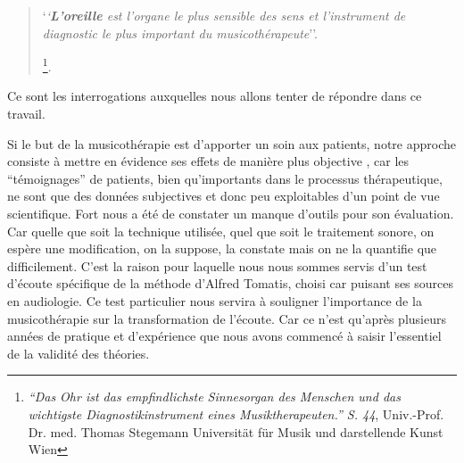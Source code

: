 \begin{quotation}
	`\textit{`\textbf{L'oreille }est l'organe le plus sensible des sens
et l'instrument de diagnostic  le plus important du
musicothérapeute}''.

\autocite{seminar_zuerich}\footnote{ \textit{``Das Ohr ist das empfindlichste
  Sinnesorgan des Menschen und das wichtigste Diagnostikinstrument
  eines Musiktherapeuten.'' S. 44}, Univ.-Prof. Dr. med. Thomas Stegemann Universität für Musik und darstellende Kunst Wien}.
 \end{quotation}
Ce sont les interrogations auxquelles nous allons tenter de
répondre dans ce travail.

Si le but de la musicothérapie est d'apporter un soin aux patients,
notre  approche consiste à mettre en évidence ses effets de manière
plus objective , car les ``témoignages'' de patients,  bien qu'importants dans le processus thérapeutique,
ne sont que des données subjectives et donc peu exploitables d'un
point de vue scientifique. Fort nous a été de
constater un manque d'outils pour son évaluation. Car quelle que soit la technique utilisée, quel que soit
le traitement sonore, on espère une modification, on la suppose, la constate
 mais
 on ne la quantifie que difficilement. C'est la raison pour laquelle
 nous nous sommes servis d'un test d'écoute
 spécifique de la méthode d'Alfred Tomatis, choisi car puisant ses
 sources en audiologie.
 Ce test particulier  nous servira à
 souligner l'importance de la musicothérapie
 sur la transformation de l'écoute.
 Car ce n'est qu'après plusieurs
années de pratique et d'expérience que nous avons commencé à saisir
l'essentiel de la validité des théories.









